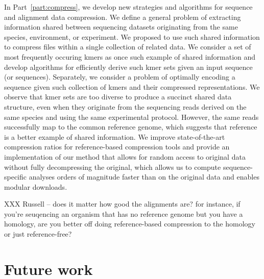 \documentclass[12pt]{cmuthesis}
\begin{document}
In Part~\ref{part:compress}, we develop new strategies and algorithms for sequence and alignment data compression. We define a general problem of extracting information shared between sequencing datasets originating from the same species, environment, or experiment. We proposed to use such shared information to compress files within a single collection of related data. We consider a set of most frequently occuring kmers as once such example of shared information and develop algorithms for efficiently derive such kmer sets given an input sequence (or sequences). Separately, we consider a problem of optimally encoding a sequence given such collection of kmers and their compressed representations. We observe that kmer sets are too diverse to produce a succinct shared data structure, even when they originate from the sequencing reads derived on the same species and using the same experimental protocol. However, the same reads successfully map to the common reference genome, which suggests that reference is a better example of shared information. We improve state-of-the-art compression ratios for reference-based compression tools and provide an implementation of our method that allows for random access to original data without fully decompressing the original, which allows us to compute sequence-specific analyses orders of magnitude faster than on the original data and enables modular downloads.


XXX Russell -- does it matter how good the alignments are? for instance, if you're seuqencing an organism that has no reference genome but you have a homology, are you better off doing reference-based compression to the homology or just reference-free?






\section{Future work}
\end{document}
